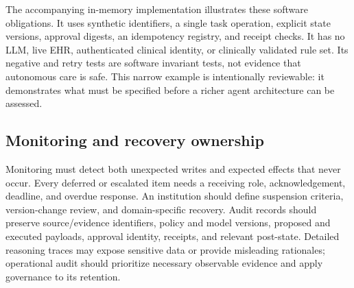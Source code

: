 The accompanying in-memory implementation illustrates these software obligations. It uses synthetic identifiers, a single task operation, explicit state versions, approval digests, an idempotency registry, and receipt checks. It has no LLM, live EHR, authenticated clinical identity, or clinically validated rule set. Its negative and retry tests are software invariant tests, not evidence that autonomous care is safe. This narrow example is intentionally reviewable: it demonstrates what must be specified before a richer agent architecture can be assessed.

\subsection{Monitoring and recovery ownership}
Monitoring must detect both unexpected writes and expected effects that never occur. Every deferred or escalated item needs a receiving role, acknowledgement, deadline, and overdue response. An institution should define suspension criteria, version-change review, and domain-specific recovery. Audit records should preserve source/evidence identifiers, policy and model versions, proposed and executed payloads, approval identity, receipts, and relevant post-state. Detailed reasoning traces may expose sensitive data or provide misleading rationales; operational audit should prioritize necessary observable evidence and apply governance to its retention.
